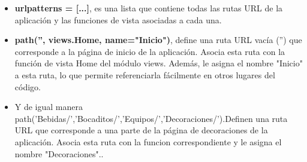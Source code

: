 \documentclass{article}
\begin{document}
	\begin{itemize}
	    \item \textbf{urlpatterns = [...]}, es una lista que contiene todas las rutas URL de la aplicación y las funciones de vista asociadas a cada una.
        \item \textbf{path('', views.Home, name="Inicio")}, define una ruta URL vacía ('') que corresponde a la página de inicio de la aplicación. Asocia esta ruta con la función de vista Home del módulo views. Además, le asigna el nombre "Inicio" a esta ruta, lo que permite referenciarla fácilmente en otros lugares del código.
        \item Y de igual manera path('Bebidas/','Bocaditos/','Equipos/','Decoraciones/').Definen una ruta URL que corresponde a una parte de la página de decoraciones de la aplicación. Asocia esta ruta con la funcion correspondiente y le asigna el nombre "Decoraciones"..
    \end{itemize}
\end{document}
